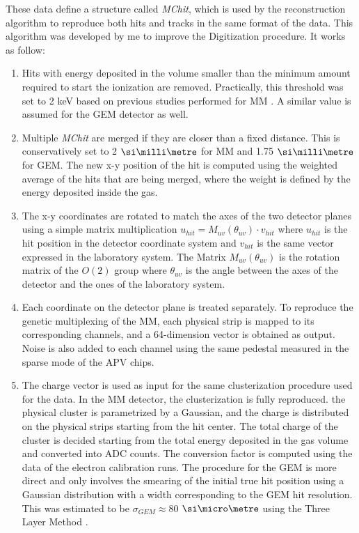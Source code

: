 These data define a structure called \textit{MChit}, which is used by the reconstruction algorithm to reproduce both hits and tracks in the same format of the data. This algorithm was developed by me to improve the Digitization procedure. It works as follow:
\begin{enumerate}

\item Hits with energy deposited in the volume smaller than the minimum amount required to start the ionization are removed. Practically, this threshold was set to 2 keV based on previous studies performed for MM \cite{IGUAZ20121079}. A similar value is assumed for the GEM detector as well.
\item Multiple \textit{MChit} are merged if they are closer than a fixed distance. This is conservatively set to 2 $\mmi$  for MM and 1.75 $\mmi$  for GEM. The new x-y position of the hit is computed using the weighted average of the hits that are being merged, where the weight is defined by the energy deposited inside the gas.
\item The x-y coordinates are rotated to match the axes of the two detector planes using a simple matrix multiplication $u_{hit} = M_{uv}(\theta_{uv}) \cdot v_{hit}$ where $u_{hit}$ is the hit position in the detector coordinate system and $v_{hit}$ is the same vector expressed in the laboratory system. The Matrix $M_{uv}(\theta_{uv})$ is the rotation matrix of the $O(2)$ group where $\theta_{uv}$ is the angle between the axes of the detector and the ones of the laboratory system.
\item Each coordinate on the detector plane is treated separately. To reproduce the genetic multiplexing of the MM, each physical strip is mapped to its corresponding channels, and a 64-dimension vector is obtained as output. Noise is also added to each channel using the same pedestal measured in the sparse mode of the APV chips.
\item  The charge vector is used as input for the same clusterization procedure used for the data. In the MM detector, the clusterization is fully reproduced. the physical cluster is parametrized by a Gaussian, and the charge is distributed on the physical strips starting from the hit center. The total charge of the cluster is decided starting from the total energy deposited in the gas volume and converted into ADC counts. The conversion factor is computed using the data of the electron calibration runs. The procedure for the GEM is more direct and only involves the smearing of the initial true hit position using a Gaussian distribution with a width corresponding to the GEM hit resolution. This was estimated to be $\sigma_{GEM} \approx 80$ $\mum$ using the Three Layer Method \cite{Bortfeldt:2014vvt}.

\end{enumerate}
